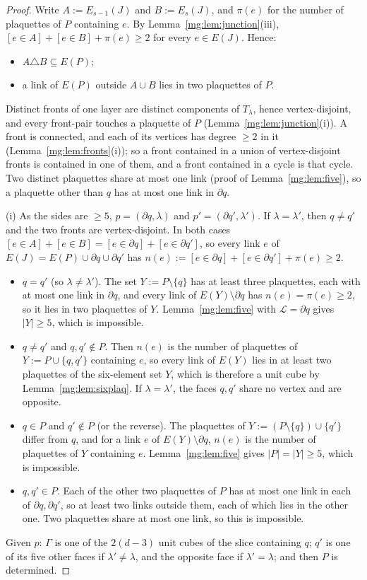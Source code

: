 \documentclass[11pt,a4paper]{article}
\theoremstyle{definition}
\theoremstyle{remark}
\begin{document}
\begin{proof}
Write $A:=E_{s-1}(J)$ and $B:=E_s(J)$, and $\pi(e)$ for the number of plaquettes of $P$ containing $e$. By Lemma~\ref{mg:lem:junction}(iii),
$[e\in A]+[e\in B]+\pi(e)\ge2$ for every $e\in E(J)$. Hence:
\begin{itemize}
\item[(a)] $A\triangle B\subseteq E(P)$;
\item[(b)] a link of $E(P)$ outside $A\cup B$ lies in two plaquettes of $P$.
\end{itemize}
Distinct fronts of one layer are distinct components of $T_\lambda$, hence vertex-disjoint, and every front-pair touches a plaquette of $P$
(Lemma~\ref{mg:lem:junction}(i)). A front is connected, and each of its vertices has degree $\ge2$ in it (Lemma~\ref{mg:lem:fronts}(i)); so a front contained in a
union of vertex-disjoint fronts is contained in one of them, and a front contained in a cycle is that cycle. Two distinct plaquettes share at most one link (proof of
Lemma~\ref{mg:lem:five}), so a plaquette other than $q$ has at most one link in $\partial q$.

(i) As the sides are $\ge5$, $p=(\partial q,\lambda)$ and $p'=(\partial q',\lambda')$. If $\lambda=\lambda'$, then $q\ne q'$ and the two fronts are vertex-disjoint. In both cases
$[e\in A]+[e\in B]=[e\in\partial q]+[e\in\partial q']$, so every link $e$ of $E(J)=E(P)\cup\partial q\cup\partial q'$ has $n(e):=[e\in\partial q]+[e\in\partial q']+\pi(e)\ge2$.
\begin{itemize}
\item $q=q'$ (so $\lambda\ne\lambda'$). The set $Y:=P\setminus\{q\}$ has at least three plaquettes, each with at most one link in $\partial q$, and every link of
$E(Y)\setminus\partial q$ has $n(e)=\pi(e)\ge2$, so it lies in two plaquettes of $Y$. Lemma~\ref{mg:lem:five} with $\mathcal L=\partial q$ gives $|Y|\ge5$, which is
impossible.
\item $q\ne q'$ and $q,q'\notin P$. Then $n(e)$ is the number of plaquettes of $Y:=P\cup\{q,q'\}$ containing $e$, so every link of $E(Y)$ lies in at least two
plaquettes of the six-element set $Y$, which is therefore a unit cube by Lemma~\ref{mg:lem:sixplaq}. If $\lambda=\lambda'$, the faces $q,q'$ share no vertex and are opposite.
\item $q\in P$ and $q'\notin P$ (or the reverse). The plaquettes of $Y:=(P\setminus\{q\})\cup\{q'\}$ differ from $q$, and for a link $e$ of $E(Y)\setminus\partial q$,
$n(e)$ is the number of plaquettes of $Y$ containing $e$. Lemma~\ref{mg:lem:five} gives $|P|=|Y|\ge5$, which is impossible.
\item $q,q'\in P$. Each of the other two plaquettes of $P$ has at most one link in each of $\partial q,\partial q'$, so at least two links outside them, each of which lies in
the other one. Two plaquettes share at most one link, so this is impossible.
\end{itemize}
Given $p$: $\Gamma$ is one of the $2(d-3)$ unit cubes of the slice containing $q$; $q'$ is one of its five other faces if $\lambda'\ne\lambda$, and the opposite face if
$\lambda'=\lambda$; and then $P$ is determined.


\end{proof}
\end{document}
